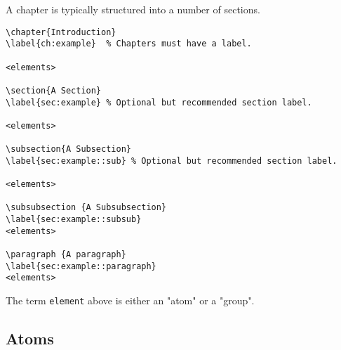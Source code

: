 \begin{example}[Segments]

A chapter is typically structured into a number of sections.

\begin{lstlisting}
\chapter{Introduction}
\label{ch:example}  % Chapters must have a label.
   
<elements>

\section{A Section}
\label{sec:example} % Optional but recommended section label.   

<elements>

\subsection{A Subsection}
\label{sec:example::sub} % Optional but recommended section label.   

<elements>

\subsubsection {A Subsubsection}
\label{sec:example::subsub}
<elements>

\paragraph {A paragraph}
\label{sec:example::paragraph}
<elements>

\end{lstlisting}
\end{example}

The term \lstinline`element` above is either an "atom" or a "group".

\subsection{Atoms}
\label{sec:mtl::atoms}

